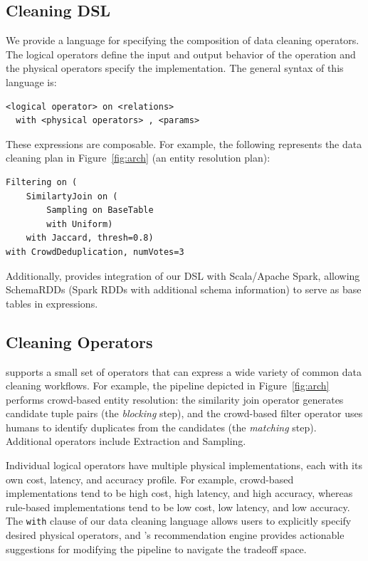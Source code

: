 \subsection{Cleaning DSL}
\label{sec:dsl}
We provide a language for specifying the composition of data cleaning operators.
The logical operators define the input and output behavior of the operation and 
the physical operators specify the implementation.
The general syntax of this language is:
{\scriptsize
\begin{lstlisting}
<logical operator> on <relations>
  with <physical operators> , <params>
\end{lstlisting}
}

These expressions are composable. For example, the following represents the data cleaning plan in Figure~\ref{fig:arch} (an entity resolution plan):
{\scriptsize
\begin{lstlisting} 
Filtering on (
    SimilartyJoin on (
        Sampling on BaseTable
        with Uniform)
    with Jaccard, thresh=0.8) 
with CrowdDeduplication, numVotes=3
\end{lstlisting}
}
Additionally, \sys provides integration of our DSL with Scala/Apache Spark, allowing SchemaRDDs (Spark RDDs with additional schema information) to serve as base tables in expressions.

\subsection{Cleaning Operators}
\label{sec:operators}
\sys supports a small set of operators that can express a wide variety of common data cleaning workflows. 
For example, the pipeline depicted in Figure~\ref{fig:arch} performs crowd-based entity resolution: the similarity join operator generates candidate tuple pairs (the \textit{blocking} step), and the crowd-based filter operator uses humans to identify duplicates from the candidates (the \textit{matching} step). 
Additional operators include Extraction and Sampling.

Individual logical operators have multiple physical implementations, each with its own cost, latency, and accuracy profile. 
For example, crowd-based implementations tend to be high cost, high latency, and high accuracy, whereas rule-based implementations tend to be low cost, low latency, and low accuracy. 
The \texttt{with} clause of our data cleaning language allows users to explicitly specify desired physical operators, and \sys's recommendation engine provides actionable suggestions for modifying the pipeline to navigate the tradeoff space.





